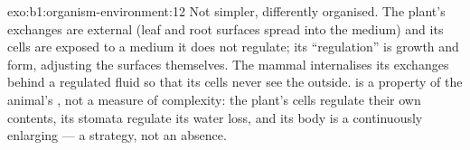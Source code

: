 \begin{solution}{exo:b1:organism-environment:12}
Not simpler, differently organised. The plant's exchanges are external
(leaf and root surfaces spread into the medium) and its cells are
exposed to a medium it does not regulate; its ``regulation'' is growth and
form, adjusting the surfaces themselves. The mammal internalises its
exchanges behind a regulated fluid so that its cells never see the
outside.  is a property of the animal's ,
not a measure of complexity: the plant's cells regulate their own
contents, its stomata regulate its water loss, and its body is a
continuously enlarging  --- a strategy, not an absence.
\end{solution}

